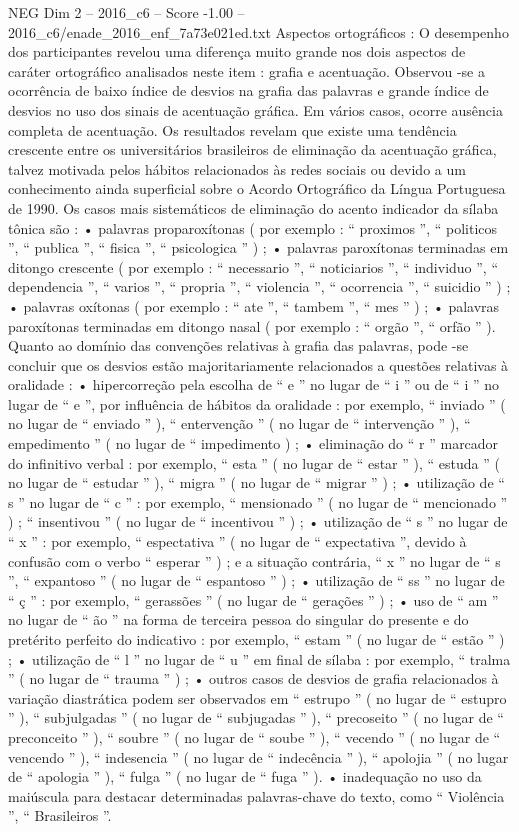 \begin{textsample}{NEG Dim 2 – 2016\_c6 – Score -1.00 – 2016\_c6/enade\_2016\_enf\_7a73e021ed.txt}
Aspectos ortográficos : O desempenho dos participantes revelou uma diferença muito grande nos dois aspectos de caráter ortográfico analisados neste item : grafia e acentuação.
Observou -se a ocorrência de baixo índice de desvios na grafia das palavras e grande índice de desvios no uso dos sinais de acentuação gráfica.
Em vários casos, ocorre ausência completa de acentuação.
Os resultados revelam que existe uma tendência crescente entre os universitários brasileiros de eliminação da acentuação gráfica, talvez motivada pelos hábitos relacionados às redes sociais ou devido a um conhecimento ainda superficial sobre o Acordo Ortográfico da Língua Portuguesa de 1990.
Os casos mais sistemáticos de eliminação do acento indicador da sílaba tônica são : • palavras proparoxítonas ( por exemplo : “ proximos ”, “ politicos ”, “ publica ”, “ fisica ”, “ psicologica ” ) ; • palavras paroxítonas terminadas em ditongo crescente ( por exemplo : “ necessario ”, “ noticiarios ”, “ individuo ”, “ dependencia ”, “ varios ”, “ propria ”, “ violencia ”, “ ocorrencia ”, “ suicidio ” ) ; • palavras oxítonas ( por exemplo : “ ate ”, “ tambem ”, “ mes ” ) ; • palavras paroxítonas terminadas em ditongo nasal ( por exemplo : “ orgão ”, “ orfão ” ).
Quanto ao domínio das convenções relativas à grafia das palavras, pode -se concluir que os desvios estão majoritariamente relacionados a questões relativas à oralidade : • hipercorreção pela escolha de “ e ” no lugar de “ i ” ou de “ i ” no lugar de “ e ”, por influência de hábitos da oralidade : por exemplo, “ inviado ” ( no lugar de “ enviado ” ), “ entervenção ” ( no lugar de “ intervenção ” ), “ empedimento ” ( no lugar de “ impedimento ) ; • eliminação do “ r ” marcador do infinitivo verbal : por exemplo, “ esta ” ( no lugar de “ estar ” ), “ estuda ” ( no lugar de “ estudar ” ), “ migra ” ( no lugar de “ migrar ” ) ; • utilização de “ s ” no lugar de “ c ” : por exemplo, “ mensionado ” ( no lugar de “ mencionado ” ) ; “ insentivou ” ( no lugar de “ incentivou ” ) ; • utilização de “ s ” no lugar de “ x ” : por exemplo, “ espectativa ” ( no lugar de “ expectativa ”, devido à confusão com o verbo “ esperar ” ) ; e a situação contrária, “ x ” no lugar de “ s ”, “ expantoso ” ( no lugar de “ espantoso ” ) ; • utilização de “ ss ” no lugar de “ ç ” : por exemplo, “ gerassões ” ( no lugar de “ gerações ” ) ; • uso de “ am ” no lugar de “ ão ” na forma de terceira pessoa do singular do presente e do pretérito perfeito do indicativo : por exemplo, “ estam ” ( no lugar de “ estão ” ) ; • utilização de “ l ” no lugar de “ u ” em final de sílaba : por exemplo, “ tralma ” ( no lugar de “ trauma ” ) ; • outros casos de desvios de grafia relacionados à variação diastrática podem ser observados em “ estrupo ” ( no lugar de “ estupro ” ), “ subjulgadas ” ( no lugar de “ subjugadas ” ), “ precoseito ” ( no lugar de “ preconceito ” ), “ soubre ” ( no lugar de “ soube ” ), “ vecendo ” ( no lugar de “ vencendo ” ), “ indesencia ” ( no lugar de “ indecência ” ), “ apolojia ” ( no lugar de “ apologia ” ), “ fulga ” ( no lugar de “ fuga ” ). • inadequação no uso da maiúscula para destacar determinadas palavras-chave do texto, como “ Violência ”, “ Brasileiros ”.

\end{textsample}
